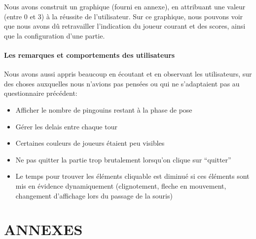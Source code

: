 \documentclass{report}
\begin{document}
Nous avons construit un graphique (fourni en annexe), en attribuant une valeur (entre 0 et 3) à la réussite de l'utilisateur. Sur ce graphique, nous pouvons voir que nous avons dû retravailler l'indication du joueur courant et des scores, ainsi que la configuration d'une partie.

\subsection{Les remarques et comportements des utilisateurs}
Nous avons aussi appris beaucoup en écoutant et en observant les utilisateurs, sur des choses auxquelles nous n'avions pas pensées ou qui ne s'adaptaient pas au questionnaire précédent:
\begin{itemize}
\item Afficher le nombre de pingouins restant à la phase de pose
\item Gérer les delais entre chaque tour
\item Certaines couleurs de joueurs étaient peu visibles
\item Ne pas quitter la partie trop brutalement lorsqu'on clique sur ``quitter''
\item Le temps pour trouver les éléments cliquable est diminué si ces éléments sont mis en évidence dynamiquement (clignotement, fleche en mouvement, changement d'affichage lors du passage de la souris)
\end{itemize}


\part*{ANNEXES}
\end{document}
